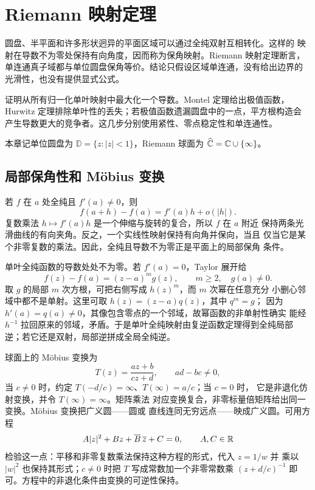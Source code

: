 \chapter{Riemann 映射定理}
\label{chap:riemann-mapping-theorem}

圆盘、半平面和许多形状迥异的平面区域可以通过全纯双射互相转化。这样的
映射在导数不为零处保持有向角度，因而称为保角映射。Riemann 映射定理断言，
单连通真子域都与单位圆盘保角等价。结论只假设区域单连通，没有给出边界的
光滑性，也没有提供显式公式。

证明从所有归一化单叶映射中最大化一个导数。Montel 定理给出极值函数，
Hurwitz 定理排除单叶性的丢失；若极值函数遗漏圆盘中的一点，平方根构造会
产生导数更大的竞争者。这几步分别使用紧性、零点稳定性和单连通性。

本章记单位圆盘为 $\mathbb D=\{z:|z|<1\}$，Riemann 球面为
$\widehat{\mathbb{C}}=\mathbb{C}\cup\{\infty\}$。

\section{局部保角性和 \texorpdfstring{M\"obius}{Mobius} 变换}

若 $f$ 在 $a$ 处全纯且 $f'(a)\ne0$，则
\[
 f(a+h)-f(a)=f'(a)h+o(|h|).
\]
复数乘法 $h\mapsto f'(a)h$ 是一个伸缩与旋转的复合，所以 $f$ 在 $a$ 附近
保持两条光滑曲线的有向夹角。反之，一个实线性映射保持有向角并保向，当且
仅当它是某个非零复数的乘法。因此，全纯且导数不为零正是平面上的局部保角
条件。

单叶全纯函数的导数处处不为零。若 $f'(a)=0$，Taylor 展开给
\[
 f(z)-f(a)=(z-a)^m g(z),\qquad m\ge2,\quad g(a)\ne0.
\]
取 $g$ 的局部 $m$ 次方根，可把右侧写成 $h(z)^m$，而 $m$ 次幂在任意充分
小删心邻域中都不是单射。这里可取 $h(z)=(z-a)q(z)$，其中 $q^m=g$；
因为 $h'(a)=q(a)\ne0$，其像包含零点的一个邻域，故幂函数的非单射性确实
能经 $h^{-1}$ 拉回原来的邻域，矛盾。于是单叶全纯映射由复逆函数定理得到全纯局部
逆；若它还是双射，局部逆拼成全局全纯逆。

球面上的 M\"obius 变换为
\[
 T(z)=\frac{az+b}{cz+d},\qquad ad-bc\ne0,
\]
当 $c\ne0$ 时，约定 $T(-d/c)=\infty$、$T(\infty)=a/c$；当 $c=0$ 时，
它是非退化仿射变换，并令 $T(\infty)=\infty$。矩阵乘法
对应变换复合，非零标量倍矩阵给出同一变换。M\"obius 变换把广义圆——圆或
直线连同无穷远点——映成广义圆。可用方程
\[
 A|z|^2+Bz+\overline B\,\overline z+C=0,
 \qquad A,C\in\mathbb{R}
\]
检验这一点：平移和非零复数乘法保持这种方程的形式，代入 $z=1/w$ 并
乘以 $|w|^2$ 也保持其形式；$c\ne0$ 时把 $T$ 写成常数加一个非零常数乘
$(z+d/c)^{-1}$ 即可。方程中的非退化条件由变换的可逆性保持。

